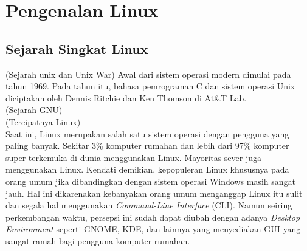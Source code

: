 \chapter{Pengenalan Linux}

\section{Sejarah Singkat Linux}
(Sejarah unix dan Unix War) Awal dari sistem operasi modern dimulai pada tahun 1969. Pada tahun itu, bahasa pemrograman C dan sistem operasi Unix diciptakan oleh Dennis Ritchie dan Ken Thomson di At\&T Lab. \\ 

(Sejarah GNU) \\ 

(Tercipatnya Linux) \\ 

Saat ini, Linux merupakan salah satu sistem operasi dengan pengguna yang paling banyak. Sekitar 3\% komputer rumahan dan lebih dari 97\% komputer super terkemuka di dunia menggunakan Linux. Mayoritas sever juga menggunakan Linux. Kendati demikian, kepopuleran Linux khususnya pada orang umum jika dibandingkan dengan sistem operasi Windows masih sangat jauh. Hal ini dikarenakan kebanyakan orang umum menganggap Linux itu sulit dan segala hal menggunakan \textit{Command-Line Interface} (CLI). Namun seiring perkembangan waktu, persepsi ini sudah dapat diubah dengan adanya \textit{Desktop Environment} seperti GNOME, KDE, dan lainnya yang menyediakan GUI yang sangat ramah bagi pengguna komputer rumahan.\\
